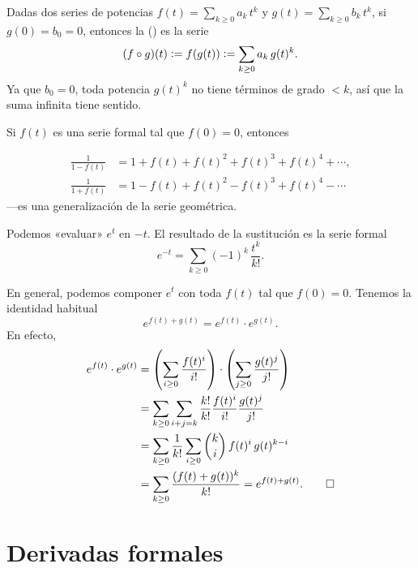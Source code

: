 \documentclass{article}
\numberwithin{equation}{section}
\theoremstyle{definition}
\begin{document}
\begin{definicion}
  Dadas dos series de potencias $f (t) = \sum_{k \ge 0} a_k \, t^k$ y
  $g (t) = \sum_{k \ge 0} b_k \, t^k$, si $g (0) = b_0 = 0$, entonces
  la  () es
  la serie
  $$(f \circ g) (t) \mathrel{\mathop:}= f (g (t)) \mathrel{\mathop:}= \sum_{k \ge 0} a_k \, g (t)^k.$$
  Ya que $b_0 = 0$, toda potencia $g (t)^k$ no tiene términos de grado $< k$,
  así que la suma infinita tiene sentido.
\end{definicion}

\begin{ejemplo}
  \label{serie-geometrica-formal}
  Si $f (t)$ es una serie formal tal que $f (0) = 0$, entonces

  \begin{align*}
    \frac{1}{1 - f (t)} & = 1 + f(t) + f (t)^2 + f(t)^3 + f (t)^4 + \cdots,\\
    \frac{1}{1 + f (t)} & = 1 - f(t) + f (t)^2 - f(t)^3 + f (t)^4 - \cdots
  \end{align*}
  ---es una generalización de la serie geométrica.
\end{ejemplo}

\begin{ejemplo}
  Podemos «evaluar» $e^t$ en $-t$. El resultado de la sustitución es la serie formal
  $$e^{-t} = \sum_{k \ge 0} (-1)^k\,\frac{t^k}{k!}.$$

  En general, podemos componer $e^t$ con toda $f (t)$ tal que $f (0) =
  0$. Tenemos la identidad habitual
  $$e^{f(t) + g(t)} = e^{f(t)}\cdot e^{g(t)}.$$
  En efecto,
  \begin{align*}
    e^{f(t)} \cdot e^{g(t)} & = \left(\sum_{i \ge 0} \frac{f(t)^i}{i!}\right) \cdot \left(\sum_{j \ge 0} \frac{g(t)^j}{j!}\right)\\
                            & = \sum_{k \ge 0} \sum_{i+j = k} \frac{k!}{k!} \frac{f(t)^i}{i!} \frac{g(t)^j}{j!} \\
                            & = \sum_{k \ge 0} \frac{1}{k!} \sum_{i \ge 0} {k \choose i} \, f(t)^i \, g(t)^{k-i} \\
                            & = \sum_{k \ge 0} \frac{(f(t)+g(t))^k}{k!} = e^{f(t)+g(t)}.
                              \qedhere
  \end{align*}
\end{ejemplo}


\section{Derivadas formales}
\end{document}

